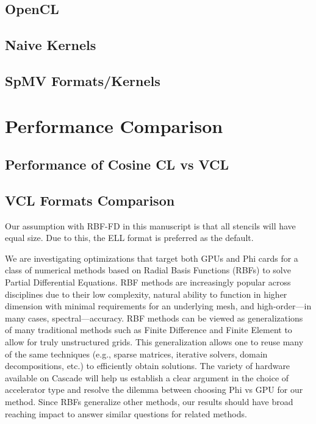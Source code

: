 \documentclass{report}
\begin{document}
\subsection{OpenCL}
\subsection{Naive Kernels}
\subsection{SpMV Formats/Kernels}

\section{Performance Comparison}
\subsection{Performance of Cosine CL vs VCL}
\subsection{VCL Formats Comparison}

Our assumption with RBF-FD in this manuscript is that all stencils will have equal size. Due to this, the ELL format is preferred as the default. 
 



We are investigating optimizations that target both GPUs and Phi cards for a class of numerical methods based on Radial Basis Functions (RBFs) to solve Partial Differential Equations. RBF methods are increasingly popular across disciplines due to their low complexity, natural ability to function in higher dimension with minimal requirements for an underlying mesh, and high-order---in many cases, spectral---accuracy. RBF methods can be viewed as generalizations of many traditional methods such as Finite Difference and Finite Element to allow for truly unstructured grids. This generalization allows one to reuse many of the same techniques (e.g., sparse matrices, iterative solvers, domain decompositions, etc.) to efficiently obtain solutions. The variety of hardware available on Cascade will help us establish a clear argument in the choice of accelerator type and resolve the dilemma between choosing Phi vs GPU for our method. Since RBFs generalize other methods, our results should have broad reaching impact to answer similar questions for related methods.
\end{document}

